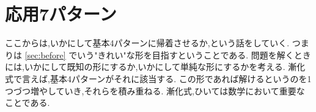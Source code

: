 
\section{応用7パターン}
  ここからは,いかにして基本4パターンに帰着させるか,という話をしていく.
  つまりは \ref{sec:before} でいう"きれい"な形を目指すということである.
  問題を解くときには,いかにして既知の形にするか,いかにして単純な形にするかを考える.
  漸化式で言えば,基本4パターンがそれに該当する.
  この形であれば解けるというのを1つづつ増やしていき,それらを積み重ねる.
  漸化式,ひいては数学において重要なことである.
  







